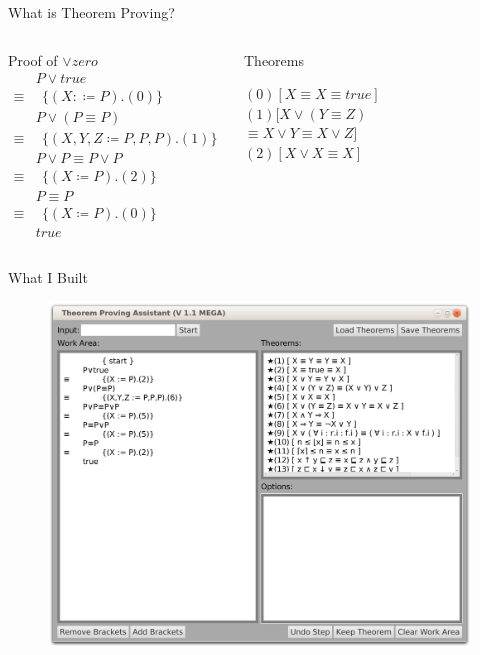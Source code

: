 \documentclass[11pt]{beamer}
\begin{document}
\begin{frame}{What is Theorem Proving?}

\begin{columns}[c] 

\begin{block}{Proof of $\vee zero$}
\begin{align*}
&P \vee true \\
\equiv&\ \ \{(X:\coloneqq P).(0)\} \\
&P \vee ( P \equiv P ) \\
\equiv&\ \ \{(X,Y,Z\coloneqq P,P,P ).(1)\} \\
&P \vee P \equiv P \vee P \\
\equiv&\ \ \{(X \coloneqq P).(2)\} \\
&P \equiv P \\
\equiv&\ \ \{(X \coloneqq P).(0)\} \\
& true
\end{align*}
\end{block}

\begin{block}{Theorems}

$(0) [X \equiv X \equiv true ]$\\
$(1) [X \vee (Y \equiv Z)$\\
\qquad\qquad\qquad$ \equiv X \vee Y \equiv X \vee Z]$\\
$(2) [X \vee X \equiv X]$

\end{block}

\end{columns}

\end{frame}

\begin{frame}{What I Built}
\begin{figure}
\includegraphics[width=0.8\linewidth]{../TheReport/screenshot}
\end{figure}
\end{frame}
\end{document}
